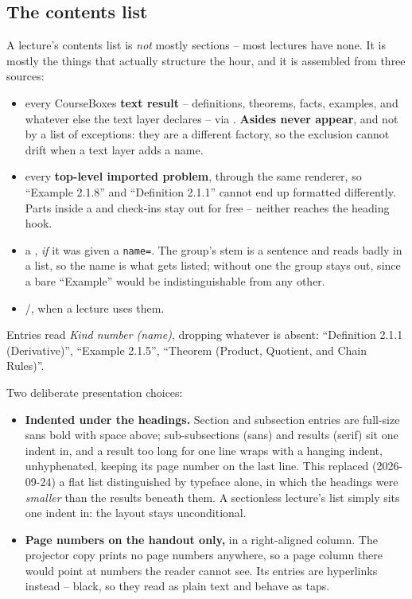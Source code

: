 \subsection*{The contents list}

A lecture's contents list is \emph{not} mostly sections -- most lectures
have none. It is mostly the things that actually structure the hour, and it
is assembled from three sources:

\begin{itemize}
  \item every CourseBoxes \textbf{text result} -- definitions, theorems,
    facts, examples, and whatever else the text layer declares -- via
    . \textbf{Asides never appear}, and not by a list
    of exceptions: they are a different factory, so the exclusion cannot
    drift when a text layer adds a name.
  \item every \textbf{top-level imported problem}, through the same
    renderer, so ``Example 2.1.8'' and ``Definition 2.1.1'' cannot end up
    formatted differently. Parts inside a  and check-ins
    stay out for free -- neither reaches the heading hook.
  \item a , \emph{if} it was given a \texttt{name=}. The
    group's stem is a sentence and reads badly in a list, so the name is what
    gets listed; without one the group stays out, since a bare ``Example''
    would be indistinguishable from any other.
  \item {}/, when a lecture uses them.
\end{itemize}

Entries read \emph{Kind number (name)}, dropping whatever is absent:
``Definition 2.1.1 (Derivative)'', ``Example 2.1.5'', ``Theorem (Product,
Quotient, and Chain Rules)''.

Two deliberate presentation choices:

\begin{itemize}
  \item \textbf{Indented under the headings.} Section and subsection
    entries are full-size sans bold with space above; sub-subsections (sans)
    and results (serif) sit one indent in, and a result too long for one line
    wraps with a hanging indent, unhyphenated, keeping its page number on the
    last line. This replaced (2026-09-24) a flat list distinguished by
    typeface alone, in which the headings were \emph{smaller} than the
    results beneath them. A sectionless lecture's list simply sits one indent
    in: the layout stays unconditional.
  \item \textbf{Page numbers on the handout only,} in a right-aligned
    column. The projector copy prints
    no page numbers anywhere, so a page column there would point at numbers
    the reader cannot see. Its entries are hyperlinks instead -- black, so
    they read as plain text and behave as taps.
\end{itemize}
